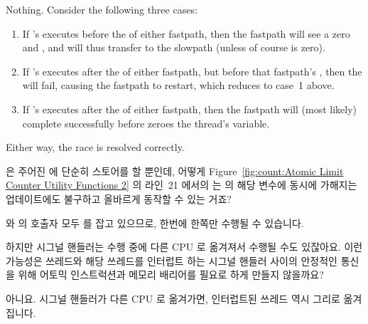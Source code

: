 \begin{enumerate}
	Nothing.
	Consider the following three cases:
	\begin{enumerate}
	\item	If 's  executes
		before the  of either fastpath,
		then the fastpath will see a zero  and
		, and will thus transfer to the slowpath
		(unless of course  is zero).
	\item	If 's  executes
		after the  of either fastpath,
		but before that fastpath's ,
		then the  will fail, causing the
		fastpath to restart, which reduces to case~1 above.
	\item	If 's  executes
		after the  of either fastpath,
		then the fastpath will (most likely) complete successfully
		before  zeroes the thread's
		 variable.
	\end{enumerate}
	Either way, the race is resolved correctly.
	\fi

\QuickQ{}
	 은 주어진  에 단순히 스토어를 할 뿐인데,
	어떻게
	Figure~\ref{fig:count:Atomic Limit Counter Utility Functions 2} 의
	라인~21 에서의  는  의 해당
	변수에 동시에 가해지는 업데이트에도 불구하고 올바르게 동작할 수 있는
	거죠?

\QuickA{}
	 와  의 호출자 모두
	 를 잡고 있으므로, 한번에 한쪽만 수행될 수 있습니다.

\QuickQ{}
	하지만 시그널 핸들러는 수행 중에 다른 CPU 로 옮겨져서 수행될 수도
	있잖아요.
	이런 가능성은 쓰레드와 해당 쓰레드를 인터럽트 하는 시그널 핸들러 사이의
	안정적인 통신을 위해 어토믹 인스트럭션과 메모리 배리어를 필요로 하게
	만들지 않을까요?

\QuickA{}
	아니요.
	시그널 핸들러가 다른 CPU 로 옮겨가면, 인터럽트된 쓰레드 역시 그리로
	옮겨집니다.
	\iffalse


\end{enumerate}
